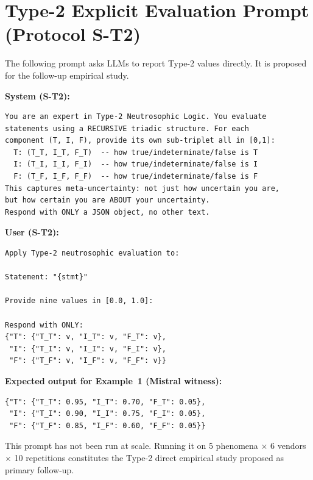 \documentclass[10pt,a4paper]{article}
\begin{document}
\appendix
\section{Type-2 Explicit Evaluation Prompt (Protocol S-T2)}
\label{app:prompt_type2}

The following prompt asks LLMs to report Type-2 values directly.
It is proposed for the follow-up empirical study.

\medskip
\noindent\textbf{System (S-T2):}
\begin{verbatim}
You are an expert in Type-2 Neutrosophic Logic. You evaluate
statements using a RECURSIVE triadic structure. For each
component (T, I, F), provide its own sub-triplet all in [0,1]:
  T: (T_T, I_T, F_T)  -- how true/indeterminate/false is T
  I: (T_I, I_I, F_I)  -- how true/indeterminate/false is I
  F: (T_F, I_F, F_F)  -- how true/indeterminate/false is F
This captures meta-uncertainty: not just how uncertain you are,
but how certain you are ABOUT your uncertainty.
Respond with ONLY a JSON object, no other text.
\end{verbatim}

\noindent\textbf{User (S-T2):}
\begin{verbatim}
Apply Type-2 neutrosophic evaluation to:

Statement: "{stmt}"

Provide nine values in [0.0, 1.0]:

Respond with ONLY:
{"T": {"T_T": v, "I_T": v, "F_T": v},
 "I": {"T_I": v, "I_I": v, "F_I": v},
 "F": {"T_F": v, "I_F": v, "F_F": v}}
\end{verbatim}

\noindent\textbf{Expected output for Example~1 (Mistral witness):}
\begin{verbatim}
{"T": {"T_T": 0.95, "I_T": 0.70, "F_T": 0.05},
 "I": {"T_I": 0.90, "I_I": 0.75, "F_I": 0.05},
 "F": {"T_F": 0.85, "I_F": 0.60, "F_F": 0.05}}
\end{verbatim}

\noindent This prompt has not been run at scale. Running it on
5 phenomena $\times$ 6 vendors $\times$ 10 repetitions constitutes
the Type-2 direct empirical study proposed as primary follow-up.
\end{document}
